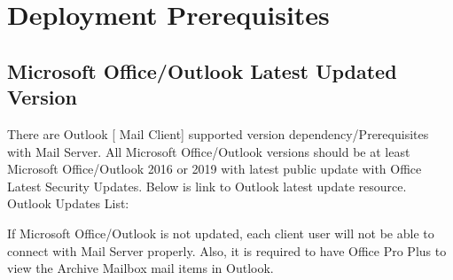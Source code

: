 \chapter{Deployment Prerequisites}

\section{Microsoft Office/Outlook Latest Updated Version}
There are Outlook [ Mail Client] supported version dependency/Prerequisites with Mail Server.
All Microsoft Office/Outlook versions should be at least Microsoft Office/Outlook  2016 or 2019 with latest public update with Office Latest Security Updates.
Below is link to Outlook latest update resource.
Outlook Updates List:  

If Microsoft Office/Outlook is not updated, each client user will not be able to connect with Mail Server properly.
Also, it is required to have Office Pro Plus to view the Archive Mailbox mail items in Outlook.


